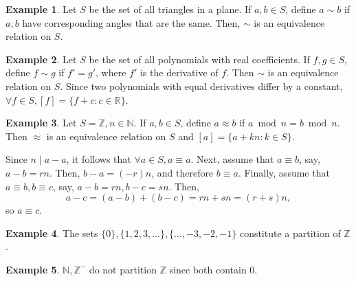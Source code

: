 \documentclass{article}
\theoremstyle{definition}
\newtheorem{definition}{Definition}[section]
\newtheorem{example}{Example}[section]
\begin{document}
\noindent{}


\begin{example}
    Let $S$ be the set of all triangles in a plane. If $a,b \in S$, define $a \sim b$ if $a,b$ have corresponding angles that are the same. Then, $\sim$ is an equivalence relation on $S$.
\end{example}

\begin{example}
    Let $S$ be the set of all polynomials with real coefficients. If $f,g \in S$, define $f \sim g$ if $f' = g'$, where $f'$ is the derivative of $f$. Then $\sim$ is an equivalence relation on $S$. Since two polynomials with equal derivatives differ by a constant, $\forall f \in S, [f] = \{f+c:c \in \mathbb{R}\}$.
\end{example}

\begin{example}
    Let $S = \mathbb{Z}, n \in \mathbb{N}$. If $a,b \in S$, define $a \approx b$ if $a \bmod n = b \bmod n$. Then $\approx$ is an equivalence relation on $S$ and $[a] = \{a+kn:k \in S\}$. 
    
    Since $n \mid a-a$, it follows that $\forall a \in S, a \equiv a$. Next, assume that $a \equiv b$, say, $a-b = rn$. Then, $b-a = (-r)n$, and therefore $b \equiv a$. Finally, assume that $a \equiv b, b \equiv c$, say, $a-b = rn, b-c = sn$. Then,
    \begin{equation*}
        a-c = (a-b)+(b-c) = rn+sn = (r+s)n,
    \end{equation*}
    so $a \equiv c$.
\end{example}

\noindent{}

\begin{example}
    The sets $\{0\},\{1,2,3,\dots\},\{\dots,-3,-2,-1\}$ constitute a partition of $\mathbb{Z}$.
\end{example}

\begin{example}
    $\mathbb{N}, \mathbb{Z}^-$ do not partition $\mathbb{Z}$ since both contain 0.
\end{example}
\end{document}
